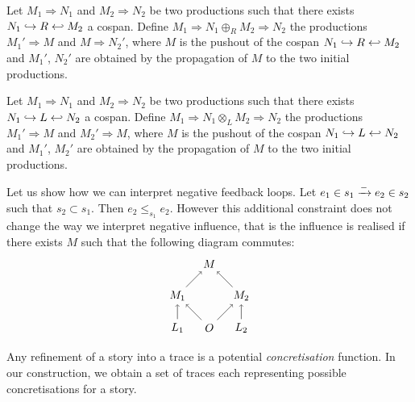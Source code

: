 \begin{definition}
\label{def:seq_comb}
  Let $M_1\Rightarrow N_1$ and $M_2\Rightarrow N_2$ be two productions such that there exists $N_1\hookrightarrow R \hookleftarrow M_2$ a cospan.
  Define $M_1\Rightarrow N_1\oplus_R M_2\Rightarrow N_2$ the productions $M_1'\Rightarrow M$ and $M\Rightarrow N_2'$, where $M$ is the pushout of the cospan $N_1\hookrightarrow R \hookleftarrow M_2$ and $M_1'$, $N_2'$ are obtained by the propagation of $M$ to the two initial productions.
\end{definition}

\begin{definition}
\label{def:conc_comb}
  Let $M_1\Rightarrow N_1$ and $M_2\Rightarrow N_2$ be two productions such that there exists $N_1\hookrightarrow L \hookleftarrow N_2$ a cospan.
  Define $M_1\Rightarrow N_1\otimes_L M_2\Rightarrow N_2$ the productions $M_1'\Rightarrow M$ and $M_2'\Rightarrow M$, where $M$ is the pushout of the cospan $N_1\hookrightarrow L \hookleftarrow N_2$ and $M_1'$, $M_2'$ are obtained by the propagation of $M$ to the two initial productions.
\end{definition}

\begin{example}
Let us show how we can interpret negative feedback loops. Let $e_1\in s_1\mathrel{\xrightarrow{-}} e_2\in s_2$ such that $s_2\subset s_1$. Then $e_2\leq_{s_1} e_2$. However this additional constraint does not change the way we interpret negative influence, that is the influence is realised if there exists $M$ such that the following diagram commutes:
\[
\begin{tikzpicture} %
  \node (o) at (0,0) {\(O\)};
  \node (n) at (0,2) {\(M\)};
  \node (l1) at (-1,0) {\(L_1\)};
  \node (l2) at (1,0) {\(L_2\)};
  \node (n1) at (-1,1) {\(M_1\)};
  \node (n2) at (1,1) {\(M_2\)};
  \draw [->] (l1) -- (n1);
  \draw [->] (l2) -- (n2);
  \draw [->] (o) -- (n1);
  \draw [->] (o) -- (n2);
  \draw [->] (n1) -- (n);
  \draw [->] (n2) -- (n);
\end{tikzpicture}
\]
\end{example}

Any refinement of a story into a trace is a potential \emph{concretisation} function. In our construction, we obtain a set of traces each representing possible concretisations for a story.


